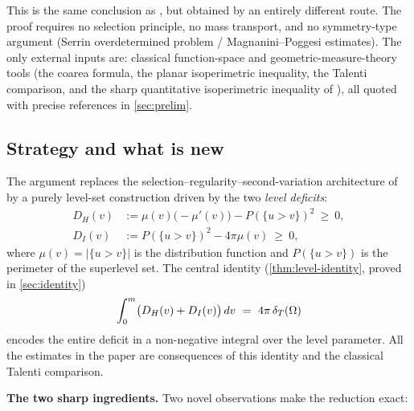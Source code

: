 This is the same conclusion as \cite{BDV2015}, but obtained by an
entirely different route.  The proof requires no selection principle,
no mass transport, and no symmetry-type argument (Serrin overde\-termined
problem / Magnanini--Poggesi estimates).  The only external inputs are:
classical function-space and geometric-measure-theory tools
(the coarea formula, the planar isoperimetric inequality, the Talenti
comparison, and the sharp quantitative isoperimetric inequality of
\cite{FMP2008}), all quoted with precise references in
\cref{sec:prelim}.

\subsection*{Strategy and what is new}

The argument replaces the selection--regularity--second-variation
architecture of \cite{BDV2015} by a purely level-set construction
driven by the two \emph{level deficits}:
\begin{align*}
  D_H(v) &:= \mu(v)\bigl(-\mu'(v)\bigr) - P(\{u>v\})^2\ \ge\ 0,\\
  D_I(v) &:= P(\{u>v\})^2 - 4\pi\mu(v)\ \ge\ 0,
\end{align*}
where $\mu(v)=|\{u>v\}|$ is the distribution function and
$P(\{u>v\})$ is the perimeter of the superlevel set.  The central
identity (\cref{thm:level-identity}, proved in \cref{sec:identity})
\[
  \int_0^m\bigl(D_H(v)+D_I(v)\bigr)\d v\ =\ 4\pi\,\dT(\Omega)
\]
encodes the entire deficit in a non-negative integral over the level
parameter.  All the estimates in the paper are consequences of this
identity and the classical Talenti comparison.

\smallskip
\noindent\textbf{The two sharp ingredients.}
Two novel observations make the reduction exact:

